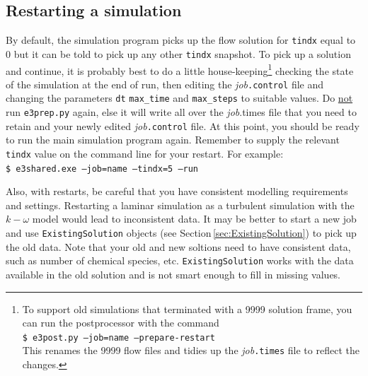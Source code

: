 \subsection{Restarting a simulation}
\label{sec:restart-sim}
%
By default, the simulation program picks up the flow solution for \texttt{tindx} equal to 0 but
it can be told to pick up any other \texttt{tindx} snapshot.
To pick up a solution and continue, it is probably best to do a little house-keeping\footnote{ 
To support old simulations that terminated with a 9999 solution frame, you can run the postprocessor 
with the command\\
\texttt{\$ e3post.py --job=name --prepare-restart}\\
This renames the 9999 flow files and tidies up the \textit{job}\texttt{.times} file to reflect the changes.
}
checking the state of the simulation at the end of run, then editing the \textit{job}\texttt{.control} 
file and changing the parameters \texttt{dt} \texttt{max\_time} and \texttt{max\_steps} to suitable values.
Do \underline{not} run \texttt{e3prep.py} again, else it will write all over the \textit{job}.times file
that you need to retain and your newly edited \textit{job}\texttt{.control} file.
At this point, you should be ready to run the main simulation program again.
Remember to supply the relevant \texttt{tindx} value on the command line for your restart.
For example:\\
\texttt{\$ e3shared.exe --job=name --tindx=5 --run}

\medskip
Also, with restarts, be careful that you have consistent modelling requirements and settings.
Restarting a laminar simulation as a turbulent simulation with the $k-\omega$ model would lead
to inconsistent data.
It may be better to start a new job and use \texttt{ExistingSolution} objects 
(see Section\,\ref{sec:ExistingSolution}) to pick up the old data. 
Note that your old and new soltions need to have consistent data, such as number of chemical species, etc.
\texttt{ExistingSolution} works with the data available in the old solution and 
is not smart enough to fill in missing values.

\newpage

